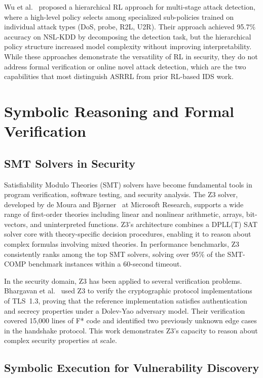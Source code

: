 \documentclass[12pt, letterpaper, oneside]{report}
\newcommand{\ASRRL}{\textsc{ASRRL}}
\begin{document}
Wu et al.~\citep{wu2022} proposed a hierarchical RL approach for multi-stage attack detection, where a high-level policy selects among specialized sub-policies trained on individual attack types (DoS, probe, R2L, U2R). Their approach achieved 95.7\% accuracy on NSL-KDD by decomposing the detection task, but the hierarchical policy structure increased model complexity without improving interpretability. While these approaches demonstrate the versatility of RL in security, they do not address formal verification or online novel attack detection, which are the two capabilities that most distinguish \ASRRL{} from prior RL-based IDS work.


\section{Symbolic Reasoning and Formal Verification}
\label{sec:lit_symbolic}

\subsection{SMT Solvers in Security}

Satisfiability Modulo Theories (SMT) solvers have become fundamental tools in program verification, software testing, and security analysis. The Z3 solver, developed by de Moura and Bj{\o}rner~\citep{demoura2008} at Microsoft Research, supports a wide range of first-order theories including linear and nonlinear arithmetic, arrays, bit-vectors, and uninterpreted functions. Z3's architecture combines a DPLL(T) SAT solver core with theory-specific decision procedures, enabling it to reason about complex formulas involving mixed theories. In performance benchmarks, Z3 consistently ranks among the top SMT solvers, solving over 95\% of the SMT-COMP benchmark instances within a 60-second timeout.

In the security domain, Z3 has been applied to several verification problems. Bhargavan et al.~\citep{bhargavan2017} used Z3 to verify the cryptographic protocol implementations of TLS~1.3, proving that the reference implementation satisfies authentication and secrecy properties under a Dolev-Yao adversary model. Their verification covered 15,000 lines of F* code and identified two previously unknown edge cases in the handshake protocol. This work demonstrates Z3's capacity to reason about complex security properties at scale.

\subsection{Symbolic Execution for Vulnerability Discovery}
\end{document}
